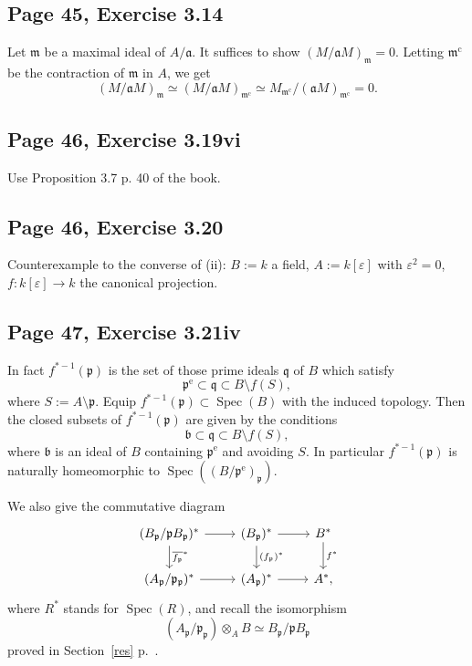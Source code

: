 \documentclass[parskip=half,fontsize=12pt]{scrartcl}%
\newcommand{\oo}{\operatorname}\newcommand{\ooo}{\operatorname*}
\newcommand{\mf}{\mathfrak}
\newcommand{\bbb}{\mf b}
\newcommand{\mmm}{\mf m}
\newcommand{\ppp}{\mf p}
\newcommand{\qqq}{\mf q}
\newcommand{\Spec}{\operatorname{Spec}}\newcommand{\Sp}{\operatorname{Spec}}
\begin{document}
\subsection{Page 45, Exercise 3.14}%

Let $\mf m$ be a maximal ideal of $A/\mf a$. It suffices to show $(M/\mf aM)_\mmm=0$. Letting $\mf m^{\oo c}$ be the contraction of $\mf m$ in $A$, we get 
$$
(M/\mf aM)_\mmm\simeq(M/\mf aM)_{\mf m^{\oo c}}\simeq M_{\mf m^{\oo c}}/(\mf aM)_{\mf m^{\oo c}}=0.
$$ 



\subsection{Page 46, Exercise 3.19vi}%

Use Proposition 3.7 p. 40 of the book.

\subsection{Page 46, Exercise 3.20}%

Counterexample to the converse of (ii): $B:=k$ a field, $A:=k[\varepsilon]$ with $\varepsilon^2=0$, $f:k[\varepsilon]\to k$ the canonical projection. 

\subsection{Page 47, Exercise 3.21iv}\label{321iv}%

In fact $f^{*-1}(\ppp)$ is the set of those prime ideals $\qqq$ of $B$ which satisfy 
$$
\ppp^{\oo{e}}\subset\qqq\subset B\setminus f(S),
$$ 
where $S:=A\setminus\ppp$. Equip $f^{*-1}(\ppp)\subset\Spec(B)$ with the induced topology. Then the closed subsets of $f^{*-1}(\ppp)$ are given by the conditions 
$$
\bbb\subset\qqq\subset B\setminus f(S),
$$ 
where $\bbb$ is an ideal of $B$ containing $\ppp^{\oo{e}}$ and avoiding $S$. In particular $f^{*-1}(\ppp)$ is naturally homeomorphic to $\Spec((B/\ppp^{\oo{e}})_\ppp)$.

We also give the commutative diagram
$$
\begin{tikzcd}
(B_\ppp/\ppp B_\ppp)^*\ar[d,"\overline{f_\ppp}^*"]\ar[r]&(B_\ppp)^*\ar[d,"(f_\ppp)^*"]\ar[r]& B^*\ar[d,"f^*"]\\ 
(A_\ppp/\ppp_\ppp)^*\ar[r]&(A_\ppp)^*\ar[r]& A^*,
\end{tikzcd}
$$ 
where $R^*$ stands for $\oo{Spec}(R)$, and recall the isomorphism 
$$
(A_\ppp/\ppp_\ppp)\otimes_AB\simeq B_\ppp/\ppp B_\ppp
$$ 
proved in Section~\ref{res} p.~\pageref{res}.
\end{document}
